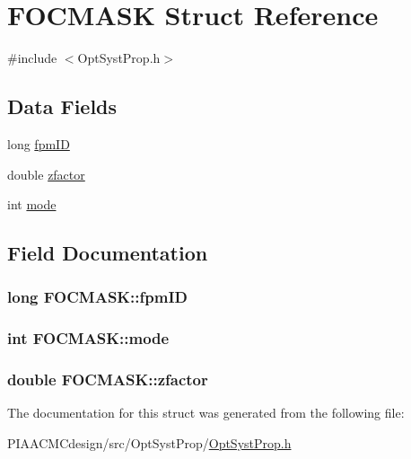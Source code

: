 \hypertarget{structFOCMASK}{\section{F\+O\+C\+M\+A\+S\+K Struct Reference}
\label{structFOCMASK}
}


{\ttfamily \#include $<$Opt\+Syst\+Prop.\+h$>$}

\subsection*{Data Fields}
\begin{DoxyCompactItemize}
\item 
long \hyperlink{structFOCMASK_aab678e43f6debad7a4699487249ef650}{fpm\+I\+D}
\item 
double \hyperlink{structFOCMASK_ae4f8bac28f3d485f900c7236b94a0aa2}{zfactor}
\item 
int \hyperlink{structFOCMASK_a16e3da16bad586e767f01533d4c64526}{mode}
\end{DoxyCompactItemize}


\subsection{Field Documentation}
\hypertarget{structFOCMASK_aab678e43f6debad7a4699487249ef650}{
\subsubsection[{fpm\+I\+D}]{\setlength{\rightskip}{0pt plus 5cm}long F\+O\+C\+M\+A\+S\+K\+::fpm\+I\+D}}\label{structFOCMASK_aab678e43f6debad7a4699487249ef650}
\hypertarget{structFOCMASK_a16e3da16bad586e767f01533d4c64526}{
\subsubsection[{mode}]{\setlength{\rightskip}{0pt plus 5cm}int F\+O\+C\+M\+A\+S\+K\+::mode}}\label{structFOCMASK_a16e3da16bad586e767f01533d4c64526}
\hypertarget{structFOCMASK_ae4f8bac28f3d485f900c7236b94a0aa2}{
\subsubsection[{zfactor}]{\setlength{\rightskip}{0pt plus 5cm}double F\+O\+C\+M\+A\+S\+K\+::zfactor}}\label{structFOCMASK_ae4f8bac28f3d485f900c7236b94a0aa2}


The documentation for this struct was generated from the following file\+:\begin{DoxyCompactItemize}
\item 
P\+I\+A\+A\+C\+M\+Cdesign/src/\+Opt\+Syst\+Prop/\hyperlink{PIAACMCdesign_2src_2OptSystProp_2OptSystProp_8h}{Opt\+Syst\+Prop.\+h}\end{DoxyCompactItemize}
